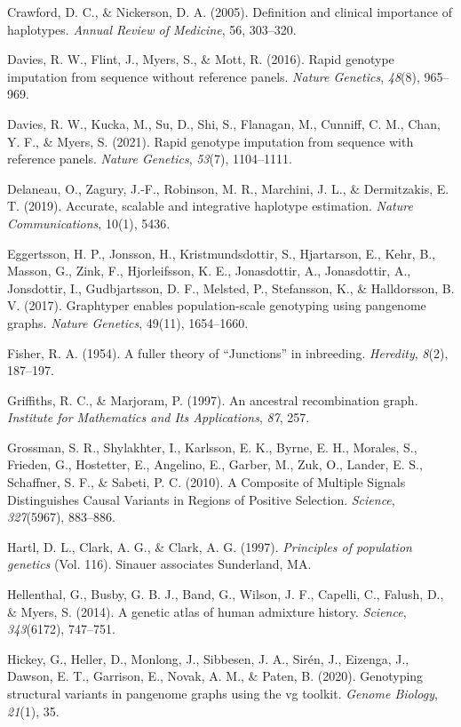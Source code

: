 \documentclass[twocolumn]{bmcart}%
\begin{document}
\begin{backmatter}
Crawford, D. C., \& Nickerson, D. A. (2005). Definition and clinical
importance of haplotypes. \emph{Annual Review of Medicine}, 56,
303--320.

Davies, R. W., Flint, J., Myers, S., \& Mott, R. (2016). Rapid genotype
imputation from sequence without reference panels. \emph{Nature
Genetics}, \emph{48}(8), 965--969.

Davies, R. W., Kucka, M., Su, D., Shi, S., Flanagan, M., Cunniff, C. M.,
Chan, Y. F., \& Myers, S. (2021). Rapid genotype imputation from
sequence with reference panels. \emph{Nature Genetics}, \emph{53}(7),
1104--1111.

Delaneau, O., Zagury, J.-F., Robinson, M. R., Marchini, J. L., \&
Dermitzakis, E. T. (2019). Accurate, scalable and integrative haplotype
estimation. \emph{Nature Communications}, 10(1), 5436.

Eggertsson, H. P., Jonsson, H., Kristmundsdottir, S., Hjartarson, E.,
Kehr, B., Masson, G., Zink, F., Hjorleifsson, K. E., Jonasdottir, A.,
Jonasdottir, A., Jonsdottir, I., Gudbjartsson, D. F., Melsted, P.,
Stefansson, K., \& Halldorsson, B. V. (2017). Graphtyper enables
population-scale genotyping using pangenome graphs. \emph{Nature
Genetics}, 49(11), 1654--1660.

Fisher, R. A. (1954). A fuller theory of ``Junctions'' in inbreeding.
\emph{Heredity}, \emph{8}(2), 187--197.

Griffiths, R. C., \& Marjoram, P. (1997). An ancestral recombination
graph. \emph{Institute for Mathematics and Its Applications}, \emph{87},
257.

Grossman, S. R., Shylakhter, I., Karlsson, E. K., Byrne, E. H., Morales,
S., Frieden, G., Hostetter, E., Angelino, E., Garber, M., Zuk, O.,
Lander, E. S., Schaffner, S. F., \& Sabeti, P. C. (2010). A Composite of
Multiple Signals Distinguishes Causal Variants in Regions of Positive
Selection. \emph{Science}, \emph{327}(5967), 883--886.

Hartl, D. L., Clark, A. G., \& Clark, A. G. (1997). \emph{Principles of
population genetics} (Vol. 116). Sinauer associates Sunderland, MA.

Hellenthal, G., Busby, G. B. J., Band, G., Wilson, J. F., Capelli, C.,
Falush, D., \& Myers, S. (2014). A genetic atlas of human admixture
history. \emph{Science}, \emph{343}(6172), 747--751.

Hickey, G., Heller, D., Monlong, J., Sibbesen, J. A., Sirén, J.,
Eizenga, J., Dawson, E. T., Garrison, E., Novak, A. M., \& Paten, B.
(2020). Genotyping structural variants in pangenome graphs using the vg
toolkit. \emph{Genome Biology}, \emph{21}(1), 35.


\end{backmatter}
\end{document}
